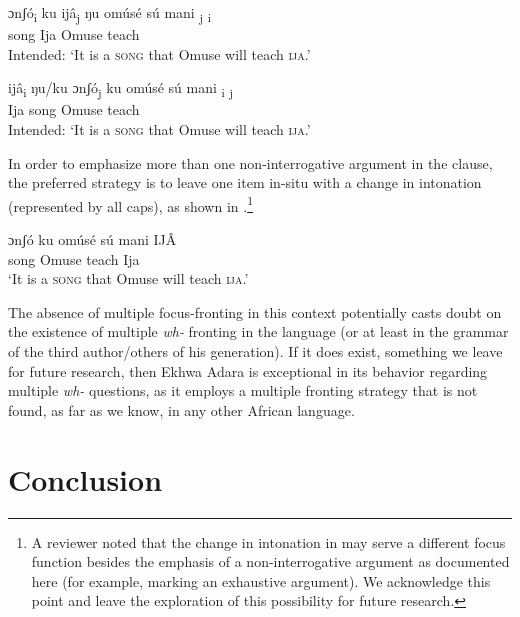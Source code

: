 \documentclass[output=paper,colorlinks,citecolor=brown
]{langscibook}
\begin{document}
\ea \label{ex:matte:23}
\begin{xlist}

\ex \label{ex:matte:23a}
\gll * ɔnʃó\textsubscript{i} ku ijâ\textsubscript{j} ŋu omúsé sú mani {\longrule}\textsubscript{j} {\longrule}\textsubscript{i}\\
{} song	\Foc{} Ija \Foc{} Omuse \Fut{} teach {} {}\\
\glt Intended: `It is a \textsc{song} that Omuse will teach \textsc{ija}.' 

\ex \label{ex:matte:23b}
\gll * ijâ\textsubscript{i} ŋu/ku ɔnʃó\textsubscript{j} ku omúsé sú mani {\longrule}\textsubscript{i} {\longrule}\textsubscript{j}\\
{} Ija \Foc{} song \Foc{} Omuse \Fut{} teach {} {}\\
\glt Intended: `It is a \textsc{song} that Omuse will teach \textsc{ija}.'

\end{xlist}
\z

\noindent In order to emphasize more than one non-interrogative argument in the clause, the preferred strategy is to leave one item in-situ with a change in intonation (represented by all caps), as shown in .\footnote{A reviewer noted that the change in intonation in  may serve a different focus function besides the emphasis of a non-interrogative argument as documented here (for example, marking an exhaustive argument). We acknowledge this point and leave the exploration of this possibility for future research.} 

\ea \label{ex:matte:24}
\gll ɔnʃó ku omúsé sú mani IJÂ\\
song \Foc{} Omuse \Fut{} teach Ija\\
\glt `It is a \textsc{song} that Omuse will teach \textsc{ija}.'
\z

\noindent The absence of multiple focus-fronting in this context potentially casts doubt on the existence of multiple \textit{wh-} fronting in the language (or at least in the grammar of the third author/others of his generation). If it does exist, something we leave for future research, then Ekhwa Adara is exceptional in its behavior regarding multiple \textit{wh-} questions, as it employs a multiple fronting strategy that is not found, as far as we know, in any other African language. 

\section{Conclusion} \label{sec:matte:4}
\end{document}
